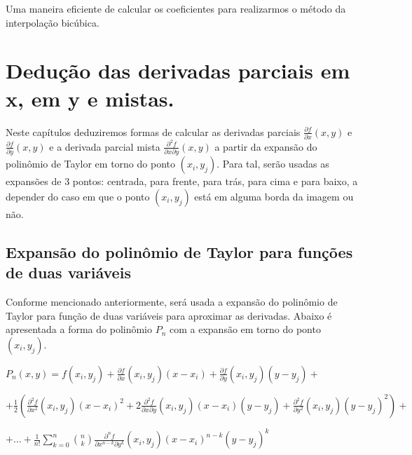 \documentclass[11pt]{article}
\newcommand{\vsp}{\vspace{0.2in}}
\begin{document}
  Uma maneira eficiente de calcular os coeficientes para realizarmos o método da interpolação bicúbica.

  \pagebreak

  \section{Dedução das derivadas parciais em x, em y e mistas.}

  \indent\indent Neste capítulos deduziremos formas de calcular as derivadas parciais  $\frac{\partial f}{\partial x}(x, y)$ e $\frac{\partial f}{\partial y}(x, y)$ e a derivada parcial mista
  $\frac{\partial^2 f}{\partial x \partial y}(x, y)$ a partir da expansão do polinômio de Taylor em torno do ponto $(x_i, y_j)$. Para tal, serão usadas as expansões de 3 pontos: centrada, para frente, para trás,
  para cima e para baixo, a depender do caso em que o ponto $(x_i, y_j)$ está em alguma borda da imagem ou não.

  \subsection{Expansão do polinômio de Taylor para funções de duas variáveis}

  \indent\indent Conforme mencionado anteriormente, será usada a expansão do polinômio de Taylor para função de duas variáveis para aproximar as derivadas. Abaixo é apresentada a forma
  do polinômio $P_n$ com a expansão em torno do ponto $(x_i, y_j)$.

  \vsp

  \begin{center}
  $P_n(x, y) = f\left(x_i, y_j\right) + \frac{\partial f}{\partial x}\left(x_i, y_j\right)\left(x - x_i\right) +
    \frac{\partial f}{\partial y}\left(x_i, y_j\right)\left(y - y_j\right) + $

  $+ \frac{1}{2}\left(\frac{\partial^2 f}{\partial x^2}\left(x_i, y_j\right)\left(x - x_i\right)^2 +
  2\frac{\partial^2 f}{\partial x \partial y}\left(x_i, y_j\right)\left(x - x_i\right)\left(y - y_j\right) +
  \frac{\partial^2 f}{\partial y^2}\left(x_i, y_j\right)\left(y - y_j\right)^2\right) + $

  $+ \dots + \frac{1}{n!}\sum\limits_{k = 0}^{n} \binom{n}{k} \frac{\partial^n f}{\partial x^{n - k} \partial y^k}\left(x_i, y_j\right)\left(x - x_i\right)^{n - k}\left(y - y_j\right)^k$

\end{center}
  \vsp
\end{document}
